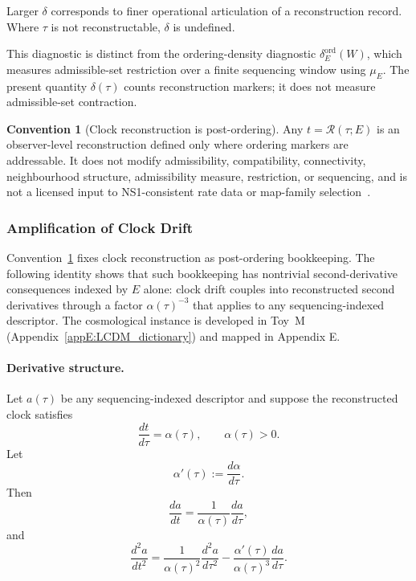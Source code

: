 \documentclass[aps,prx,onecolumn,11pt]{revtex4-2}
\theoremstyle{plain}
\theoremstyle{definition}
\newtheorem{convention}{Convention}
\theoremstyle{remark}
\begin{document}
Larger \(\delta\) corresponds to finer operational articulation of a
reconstruction record. Where \(\tau\) is not reconstructable,
\(\delta\) is undefined.

This diagnostic is distinct from the ordering-density diagnostic
\(\delta_E^{\mathrm{ord}}(W)\), which measures admissible-set
restriction over a finite sequencing window using \(\mu_E\). The present
quantity \(\delta(\tau)\) counts reconstruction markers; it does not
measure admissible-set contraction.

\begin{convention}[Clock reconstruction is post-ordering]
\label{conv:clock_reconstruction_postorder}
Any \(t=\mathcal{R}(\tau;E)\) is an observer-level reconstruction
defined only where ordering markers are addressable. It does not modify
admissibility, compatibility, connectivity, neighbourhood structure,
admissibility measure, restriction, or sequencing, and is not a licensed
input to NS1-consistent rate data or map-family
selection~\cite{BreuerPetruccione2002,Zurek2005}.
\end{convention}

\subsubsection{Amplification of Clock Drift}
\label{subsubsec:clock_drift_amplification}

Convention~\ref{conv:clock_reconstruction_postorder} fixes clock
reconstruction as post-ordering bookkeeping. The following identity shows
that such bookkeeping has nontrivial second-derivative consequences
indexed by \(E\) alone: clock drift couples into reconstructed second
derivatives through a factor \(\alpha(\tau)^{-3}\) that applies to any
sequencing-indexed descriptor. The cosmological instance is developed in
Toy~M (Appendix~\ref{appE:LCDM_dictionary}) and mapped in Appendix E.

\paragraph{Derivative structure.}

Let \(a(\tau)\) be any sequencing-indexed descriptor and suppose the
reconstructed clock satisfies
\[
\frac{dt}{d\tau}
=
\alpha(\tau),
\qquad
\alpha(\tau)>0.
\]
Let
\[
\alpha'(\tau)
:=
\frac{d\alpha}{d\tau}.
\]
Then
\[
\frac{da}{dt}
=
\frac{1}{\alpha(\tau)}
\frac{da}{d\tau},
\]
and
\begin{equation}
\frac{d^2 a}{dt^2}
=
\frac{1}{\alpha(\tau)^2}
\frac{d^2 a}{d\tau^2}
-
\frac{\alpha'(\tau)}{\alpha(\tau)^3}
\frac{da}{d\tau}.
\label{eq:clock_drift_second_derivative}
\end{equation}
\end{document}
